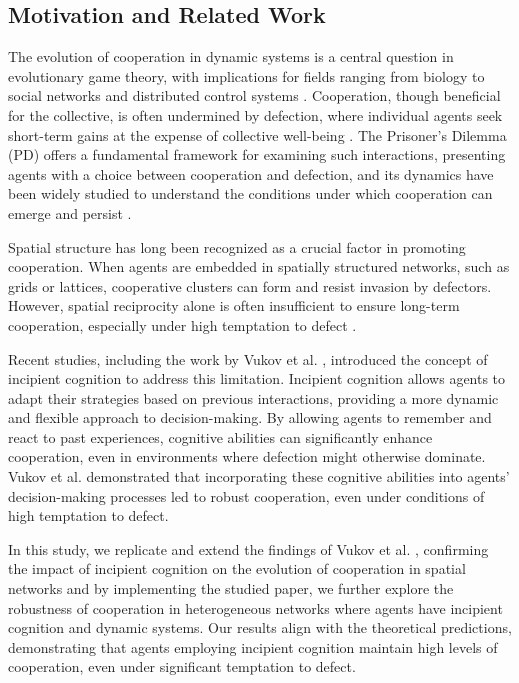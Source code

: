 \documentclass[runningheads]{llncs}
\begin{document}
\subsection{Motivation and Related Work}
The evolution of cooperation in dynamic systems is a central question in evolutionary
game theory, with implications for fields ranging from biology to social networks
and distributed control systems \cite{nowak2006}. Cooperation, though beneficial for the collective,
is often undermined by defection, where individual agents seek short-term gains at
the expense of collective well-being \cite{axelrod1981}. The Prisoner’s Dilemma (PD) offers a
fundamental framework for examining such interactions, presenting agents with a
choice between cooperation and defection, and its dynamics have been widely studied
to understand the conditions under which cooperation can emerge and persist \cite{nowak1992}.

Spatial structure has long been recognized as a crucial factor in promoting cooperation.
When agents are embedded in spatially structured networks, such as grids or lattices,
cooperative clusters can form and resist invasion by defectors. However, spatial
reciprocity alone is often insufficient to ensure long-term cooperation, especially
under high temptation to defect \cite{nowak1992,szabo2007}.


Recent studies, including the work by Vukov et al. \cite{vukov}, introduced the concept of incipient
cognition to address this limitation.
Incipient cognition allows agents to adapt their strategies based on previous
interactions, providing a more dynamic and flexible approach to decision-making.
By allowing agents to remember and react to past experiences, cognitive abilities
can significantly enhance cooperation, even in environments where defection might
otherwise dominate. Vukov et al. demonstrated that incorporating these cognitive
abilities into agents' decision-making processes led to robust cooperation,
even under conditions of high temptation to defect.

In this study, we replicate and extend the findings of Vukov et al. \cite{vukov},
confirming the impact of incipient cognition on the evolution of cooperation in
spatial networks and by implementing the studied paper, we further explore the
robustness of cooperation in heterogeneous networks where agents have incipient cognition
and dynamic systems.
Our results align with the theoretical predictions, demonstrating that agents
employing incipient cognition maintain high levels of cooperation, even under
significant temptation to defect.
\end{document}

